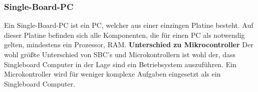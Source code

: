 \subsubsection{Single-Board-PC}
\label{subsec:Single-Board-PC}
Ein Single-Board-PC ist ein PC, welcher aus einer einzingen Platine besteht. Auf dieser Platine befinden sich alle Komponenten, die für einen PC als notwendig gelten, mindestens ein Prozessor, RAM. 
\nextline
\textbf{Unterschied zu Mikrocontroller\nextline}
Der wohl größte Unterschied von SBC’s und Microkontrollern ist wohl der, dass Singleboard Computer in der Lage sind ein Betriebsystem auszuführen. Ein Microkontroller wird für weniger komplexe Aufgaben eingesetzt als ein Singleboard Computer.


\clearpage %